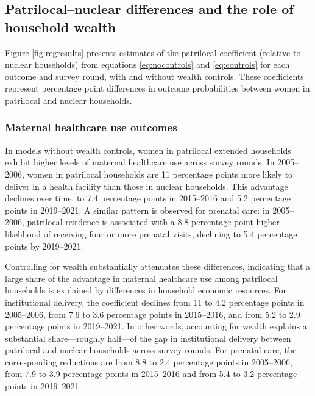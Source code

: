 \documentclass[10pt,twoside,reqno]{article}
\begin{document}




\subsection{Patrilocal–nuclear differences and the role of household wealth}

Figure \ref{fig:regresults} presents estimates of the patrilocal coefficient (relative to nuclear households) from equations \ref{eq:nocontrols} and \ref{eq:controls} for each outcome and survey round, with and without wealth controls. These coefficients represent percentage point differences in outcome probabilities between women in patrilocal and nuclear households.

\subsubsection{ Maternal healthcare use outcomes}

In models without wealth controls, women in patrilocal extended households exhibit higher levels of maternal healthcare use across survey rounds. In 2005–2006, women in patrilocal households are 11 percentage points more likely to deliver in a health facility than those in nuclear households. This advantage declines over time, to 7.4 percentage points in 2015–2016 and 5.2 percentage points in 2019–2021. A similar pattern is observed for prenatal care: in 2005–2006, patrilocal residence is associated with a 8.8 percentage point higher likelihood of receiving four or more prenatal visits, declining to 5.4 percentage points by 2019–2021.

Controlling for wealth substantially attenuates these differences, indicating that a large share of the advantage in maternal healthcare use among patrilocal households is explained by differences in household economic resources. For institutional delivery, the coefficient declines from 11 to 4.2 percentage points in 2005–2006, from 7.6 to 3.6 percentage points in 2015–2016, and from 5.2 to 2.9 percentage points in 2019–2021. In other words, accounting for wealth explains a substantial share—roughly half—of the gap in institutional delivery between patrilocal and nuclear households across survey rounds. For prenatal care, the corresponding reductions are from 8.8 to 2.4 percentage points in 2005–2006, from 7.9 to 3.9 percentage points in 2015–2016 and from 5.4 to 3.2 percentage points in 2019–2021.
\end{document}
